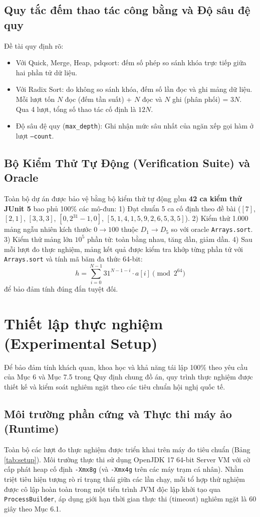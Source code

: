 \documentclass[conference]{IEEEtran}
\begin{document}
\subsection{Quy tắc đếm thao tác công bằng và Độ sâu đệ quy}
Đề tài quy định rõ:
\begin{itemize}
    \item Với Quick, Merge, Heap, pdqsort: đếm số phép so sánh khóa trực tiếp giữa hai phần tử dữ liệu.
    \item Với Radix Sort: do không so sánh khóa, đếm số lần đọc và ghi mảng dữ liệu. Mỗi lượt tốn $N$ đọc (đếm tần suất) + $N$ đọc và $N$ ghi (phân phối) = $3N$. Qua 4 lượt, tổng số thao tác cố định là $12N$.
    \item Độ sâu đệ quy (\texttt{max\_depth}): Ghi nhận mức sâu nhất của ngăn xếp gọi hàm ở lượt \texttt{--count}.
\end{itemize}

\subsection{Bộ Kiểm Thử Tự Động (Verification Suite) và Oracle}
Toàn bộ dự án được bảo vệ bằng bộ kiểm thử tự động gồm \textbf{42 ca kiểm thử JUnit 5} bao phủ 100\% các mô-đun:
1) Đạt chuẩn 5 ca cố định theo đề bài ($[7]$, $[2, 1]$, $[3, 3, 3]$, $[0, 2^{31}-1, 0]$, $[5, 1, 4, 1, 5, 9, 2, 6, 5, 3, 5]$).
2) Kiểm thử 1.000 mảng ngẫu nhiên kích thước $0 \to 100$ thuộc $D_1 \to D_5$ so với oracle \texttt{Arrays.sort}.
3) Kiểm thử mảng lớn $10^5$ phần tử: toàn bằng nhau, tăng dần, giảm dần.
4) Sau mỗi lượt đo thực nghiệm, mảng kết quả được kiểm tra khớp từng phần tử với \texttt{Arrays.sort} và tính mã băm đa thức 64-bit:
\begin{equation}
h = \sum_{i=0}^{N-1} 31^{N-1-i} \cdot a[i] \pmod{2^{64}}
\end{equation}
để bảo đảm tính đúng đắn tuyệt đối.

\section{Thiết lập thực nghiệm (Experimental Setup)}
Để bảo đảm tính khách quan, khoa học và khả năng tái lập 100\% theo yêu cầu của Mục 6 và Mục 7.5 trong Quy định chung đồ án, quy trình thực nghiệm được thiết kế và kiểm soát nghiêm ngặt theo các tiêu chuẩn hội nghị quốc tế.

\subsection{Môi trường phần cứng và Thực thi máy ảo (Runtime)}
Toàn bộ các lượt đo thực nghiệm được triển khai trên máy đo tiêu chuẩn (Bảng \ref{tab:setup}). Môi trường thực thi sử dụng OpenJDK 17 64-bit Server VM với cờ cấp phát heap cố định \texttt{-Xmx8g} (và \texttt{-Xmx4g} trên các máy trạm cá nhân). Nhằm triệt tiêu hiện tượng rò rỉ trạng thái giữa các lần chạy, mỗi tổ hợp thử nghiệm được cô lập hoàn toàn trong một tiến trình JVM độc lập khởi tạo qua \texttt{ProcessBuilder}, áp dụng giới hạn thời gian thực thi (timeout) nghiêm ngặt là 60 giây theo Mục 6.1.
\end{document}
